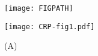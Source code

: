 



\usepackage{graphicx} 
\usepackage{caption}

\begin{figure}
	\centering
	\texttt{[image: FIGPATH]}
	\clearpage %
	\label{fig:XXX:XXX}
\end{figure}	

\clearpage





\begin{figure}
	\centering
	\texttt{[image: CRP-fig1.pdf]}
	\caption{ 
		(A) 
	}
	\label{fig:CRP:fig1}
\end{figure}
